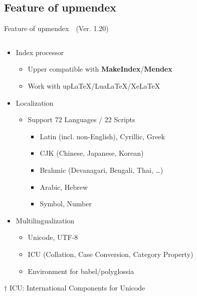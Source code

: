 \documentclass[aspectratio=169,10pt]{beamer}
\begin{document}
\subsection{Feature of upmendex}
\begin{frame}{Feature of upmendex~~{\scriptsize (Ver. 1.20)}}
\renewcommand{\thefootnote}{$\dagger$}
\begin{columns}
\begin{column}{120mm}
\begin{center}
  \begin{itemize}
  \item Index processor
    \begin{itemize}
    \item Upper compatible with \textbf{MakeIndex}/\textbf{Mendex}
    \item Work with upLaTeX/LuaLaTeX/XeLaTeX
    \end{itemize}
  \item Localization
    \begin{itemize}
    \item Support 72 Languages / 22 Scripts
      \begin{itemize}
      \item Latin (incl. non-English), Cyrillic, Greek
      \item CJK (Chinese, Japanese, Korean)
      \item Brahmic (Devanagari, Bengali, Thai, \ldots)
      \item Arabic, Hebrew
      \item Symbol, Number
      \end{itemize}
    \end{itemize}
  \item Multilingualization
    \begin{itemize}
    \item Unicode, UTF-8
    \item ICU\footnotemark{} (Collation, Case Conversion, Category Property)
    \item Environment for babel/polyglossia
    \end{itemize}
  \end{itemize}
\end{center}
\vspace{2mm}
{\footnotesize $\dagger$ ICU: International Components for Unicode}
\end{column}
\end{columns}
\end{frame}
\end{document}

